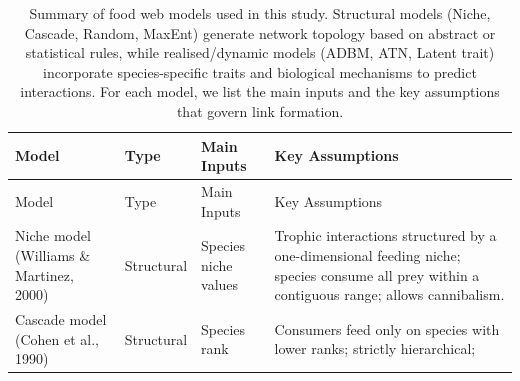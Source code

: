 \documentclass[
]{article}
\begin{document}
\begin{longtable}[]{@{}
  >{\raggedright\arraybackslash}p{}
  >{\raggedright\arraybackslash}p{}
  >{\raggedright\arraybackslash}p{}
  >{\raggedright\arraybackslash}p{}@{}}
\caption{Summary of food web models used in this study. Structural
models (Niche, Cascade, Random, MaxEnt) generate network topology based
on abstract or statistical rules, while realised/dynamic models (ADBM,
ATN, Latent trait) incorporate species-specific traits and biological
mechanisms to predict interactions. For each model, we list the main
inputs and the key assumptions that govern link
formation.}\label{tbl-models}\tabularnewline
\toprule\noalign{}
\begin{minipage}[b]{\linewidth}\raggedright
Model
\end{minipage} & \begin{minipage}[b]{\linewidth}\raggedright
Type
\end{minipage} & \begin{minipage}[b]{\linewidth}\raggedright
Main Inputs
\end{minipage} & \begin{minipage}[b]{\linewidth}\raggedright
Key Assumptions
\end{minipage} \\
\midrule\noalign{}
\endfirsthead
\toprule\noalign{}
\begin{minipage}[b]{\linewidth}\raggedright
Model
\end{minipage} & \begin{minipage}[b]{\linewidth}\raggedright
Type
\end{minipage} & \begin{minipage}[b]{\linewidth}\raggedright
Main Inputs
\end{minipage} & \begin{minipage}[b]{\linewidth}\raggedright
Key Assumptions
\end{minipage} \\
\midrule\noalign{}
\endhead
\bottomrule\noalign{}
\endlastfoot
Niche model (Williams \& Martinez, 2000) & Structural & Species niche
values & Trophic interactions structured by a one-dimensional feeding
niche; species consume all prey within a contiguous range; allows
cannibalism. \\
Cascade model (Cohen et al., 1990) & Structural & Species rank &
Consumers feed only on species with lower ranks; strictly hierarchical;

\end{longtable}
\end{document}
